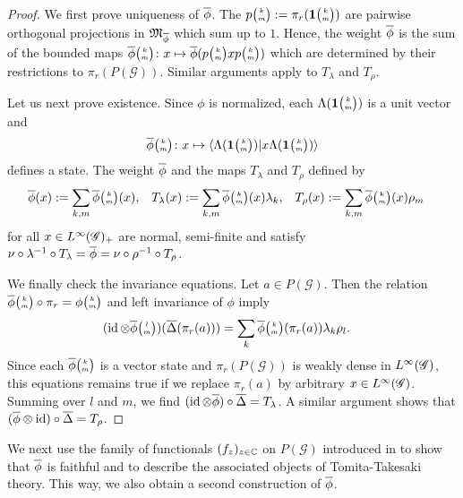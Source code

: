 \begin{proof}
  We first prove uniqueness of $\overline{\phi}$.  The
  $p{\tiny {\begin{pmatrix} k\\m\end{pmatrix}}}:=\pi_{r}(\mathbf{1}{\tiny {\begin{pmatrix} k\\m\end{pmatrix}}})$ are pairwise orthogonal
  projections in $\mathfrak{M}_{\overline{\phi}}$ which sum up to $1$. Hence, the
  weight $\overline{\phi}$ is the sum of the bounded maps
  $\overline{\phi}{\tiny {\begin{pmatrix} k\\m\end{pmatrix}}} \colon x \mapsto
  \overline{\phi}(p{\tiny {\begin{pmatrix} k\\m\end{pmatrix}}}xp{\tiny {\begin{pmatrix} k\\m\end{pmatrix}}})$ which are determined
  by their restrictions to $\pi_{r}(P(\mathscr{G}))$. Similar
  arguments apply to $T_{\lambda}$ and $T_{\rho}$.

Let us next prove existence.  Since $\phi$ is normalized,   each
$\Lambda(\mathbf{1}{\tiny {\begin{pmatrix} k\\m\end{pmatrix}}})$ is a unit vector and
\begin{align*}
  \overline{\phi}{\tiny {\begin{pmatrix} k\\m\end{pmatrix}}} \colon x \mapsto \langle \Lambda(\mathbf{1}{\tiny {\begin{pmatrix} k\\m\end{pmatrix}}})|x \Lambda(\mathbf{1}{\tiny {\begin{pmatrix} k\\m\end{pmatrix}}})\rangle
\end{align*}
defines a state. The weight $\overline{\phi}$ and the maps $T_{\lambda}$ and $T_{\rho}$
defined by
\begin{align} \label{eq:vn-weights}
  \overline{\phi}(x) &:= \sum_{k,m} \overline{\phi}{\tiny {\begin{pmatrix} k\\m\end{pmatrix}}}(x), &
    T_{\lambda}(x)&:= \sum_{k,m}
\overline{\phi}{\tiny {\begin{pmatrix} k\\m\end{pmatrix}}}(x)\lambda_{k}, & 
T_{\rho}(x)&:=
    \sum_{k,m} \overline{\phi}{\tiny {\begin{pmatrix} k\\m\end{pmatrix}}}(x)\rho_{m}
\end{align}
for all $x\in L^{\infty}(\mathscr{G})_{+}$  are normal, semi-finite and satisfy $\nu
\circ \lambda^{-1} \circ T_{\lambda} = \overline{\phi} = \nu \circ \rho^{-1}
\circ T_{\rho}$.

We finally check the invariance equations.  Let $a \in
P(\mathscr{G})$.  Then the relation $\overline{\phi}{\tiny {\begin{pmatrix} k\\m\end{pmatrix}}}\circ \pi_{r} = \phi{\tiny {\begin{pmatrix} k\\m\end{pmatrix}}}$
and left invariance of $\phi$ imply
  \begin{align*}
    (\operatorname{id} \otimes \overline{\phi}{\tiny {\begin{pmatrix} l\\m\end{pmatrix}}})(\overline{\Delta}(\pi_{r}(a))) &= \sum_{k}
    \overline{\phi}{\tiny {\begin{pmatrix} k\\m\end{pmatrix}}}(\pi_{r}(a)) \lambda_{k}\rho_{l}.
  \end{align*}
  Since each $\overline{\phi}{\tiny {\begin{pmatrix} k\\m\end{pmatrix}}}$ is a vector state and $\pi_{r}(P(\mathscr{G}))$ is
  weakly dense in $L^{\infty}(\mathscr{G})$,  this equations
  remains true if we replace $\pi_{r}(a)$ by arbitrary $x\in
  L^{\infty}(\mathscr{G})$. Summing over $l$ and $m$, we  find $(\operatorname{id} \otimes \overline{\phi})
  \circ \overline{\Delta} = T_{\lambda}$. A similar argument shows that
  $(\overline{\phi} \otimes \operatorname{id}) \circ \overline{\Delta}=T_{\rho}$.
\end{proof}

We next use the family of functionals $(f_{z})_{z \in \mathbb{C}}$ on
$P(\mathscr{G})$ introduced in \cite[Theorem 2.25]{DCT1} to show that
$\overline{\phi}$ is faithful and to describe the associated objects of
Tomita-Takesaki theory. This way, we  also obtain a second construction of
$\overline{\phi}$. 

